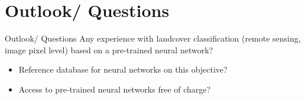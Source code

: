 \documentclass[
  ignorenonframetext,
]{beamer}
\begin{document}
\hypertarget{outlook-questions}{%
\section{Outlook/ Questions}\label{outlook-questions}}

\begin{frame}{Outlook/ Questions}
Any experience with landcover classification (remote sensing, image
pixel level) based on a pre-trained neural network?

\begin{itemize}
\item Reference database for neural networks on this objective?
\item Access to pre-trained neural networks free of charge?
\end{itemize}
\end{frame}
\end{document}
